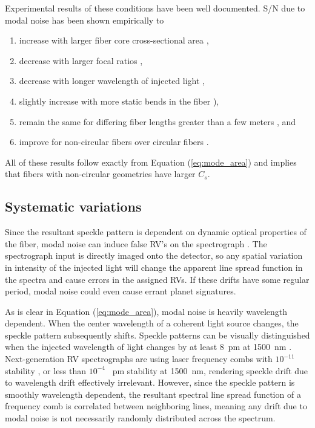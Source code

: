Experimental results of these conditions have been well documented. S/N due to modal noise has been shown empirically to
\begin{enumerate}
\item increase with larger fiber core cross-sectional area \citep{lemke_characterising_2010, sablowski_comparing_2016},
\item decrease with larger focal ratios \citep{baudrand_modal_2001, sablowski_comparing_2016},
\item decrease with longer wavelength of injected light \citep{baudrand_modal_2001},
\item slightly increase with more static bends in the fiber \citep[changing the NA;][]{imai_evaluation_1979}),
\item remain the same for differing fiber lengths greater than a few meters \citep{baudrand_modal_2001}, and
\item improve for non-circular fibers over circular fibers \citep{sablowski_comparing_2016, sturmer_optimal_2016}.
\end{enumerate}
All of these results follow exactly from Equation (\ref{eq:mode_area}) and implies that fibers with non-circular geometries have larger $C_{s}$.

\subsection{Systematic variations}
\label{subsec:sys_var}

Since the resultant speckle pattern is dependent on dynamic optical properties of the fiber, modal noise can induce false RV's on the spectrograph \citep{mahadevan_suppression_2014}. The spectrograph input is directly imaged onto the detector, so any spatial variation in intensity of the injected light will change the apparent line spread function in the spectra and cause errors in the assigned RVs. If these drifts have some regular period, modal noise could even cause errant planet signatures.

As is clear in Equation (\ref{eq:mode_area}), modal noise is heavily wavelength dependent. When the center wavelength of a coherent light source changes, the speckle pattern subsequently shifts.  Speckle patterns can be visually distinguished when the injected wavelength of light changes by at least \SI{8}{\pico\meter} at \SI{1500}{\nano\meter} \citep{redding_all-fiber_2013}. Next-generation RV spectrographs are using laser frequency combs with $10^{-11}$ stability \citep{probst_laser_2014}, or less than $10^{-4}$ \SI{}{\pico\meter} stability at \SI{1500}{\nano\meter}, rendering speckle drift due to wavelength drift effectively irrelevant. However, since the speckle pattern is smoothly wavelength dependent, the resultant spectral line spread function of a frequency comb is correlated between neighboring lines, meaning any drift due to modal noise is not necessarily randomly distributed across the spectrum.


